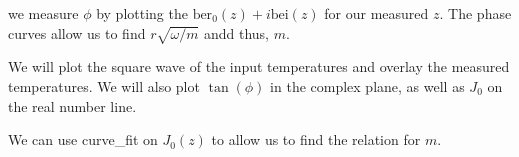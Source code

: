 \documentclass[footheight=20pt, footsepline, headheight=20pt, headsepline]{scrartcl}
\begin{document}
\noindent\hrulefill

we measure $\phi$ by plotting the $\text{ber}_0 (z) + i \text{bei}(z)$ for our measured $z$.
The phase curves allow us to find $r \sqrt{\omega/m}$ andd thus, $m$.

We will plot the square wave of the input temperatures and overlay the measured temperatures. 
We will also plot $\tan(\phi)$ in the complex plane, as well as $J_0$ on the real number line.

We can use curve\_fit on $J_0 (z)$ to allow us to find the relation for $m$.







\end{document}
